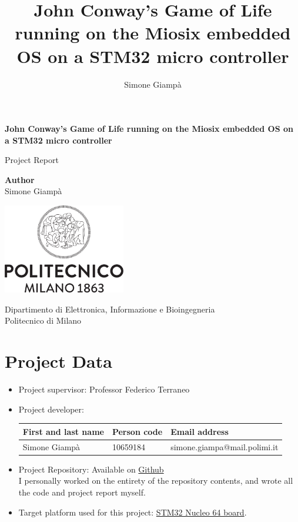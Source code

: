\documentclass[10pt]{article}
\author{Simone Giampà}
\title{John Conway's Game of Life running on the Miosix embedded OS on a STM32 micro controller}
\begin{document}
\begin{titlepage}
    \begin{center}
    \vspace*{3cm}
    
    \textbf{\Large John Conway's Game of Life running on the Miosix embedded OS on a STM32 micro controller}
    
    \vspace{1.5cm}
    \large Project Report
                
    \vfill
    
    \textbf{Author}\\Simone Giampà
    
    \vspace{0.8cm}
         
    \includegraphics[width=0.4\textwidth]{images/Logo_Politecnico_Milano.png}
        
    \vspace{0.5cm}
    
    Dipartimento di Elettronica, Informazione e Bioingegneria\\
    Politecnico di Milano\\
    \end{center}
\end{titlepage}


\tableofcontents
\newpage

\section{Project Data}

\begin{itemize}
\item 
    Project supervisor: Professor Federico Terraneo
\item 
    Project developer:
\begin{center}
\begin{tabular}{lll}
    First and last name & Person code & Email address\\
\hline
  Simone Giampà & 10659184 & simone.giampa@mail.polimi.it \\
\end{tabular}
\end{center}

\item 
    Project Repository: Available on \href{https://github.com/SimonGiampy/STM32-Miosix-GameOfLife}{Github} \\
    I personally worked on the entirety of the repository contents, and wrote all the code and project report myself.
    
\item Target platform used for this project: \href{https://www.st.com/en/evaluation-tools/nucleo-f401re.html}{STM32 Nucleo 64 board}.
\end{itemize}
\end{document}
